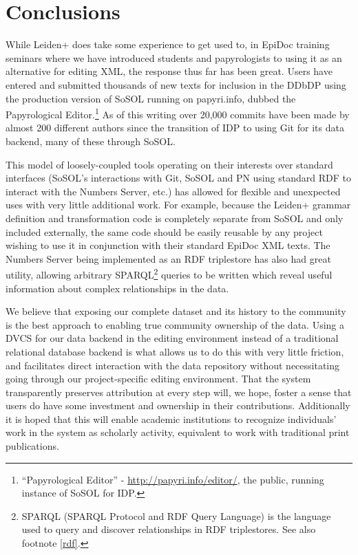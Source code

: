 \documentclass[]{article}
\begin{document}
\section*{Conclusions}

While Leiden+ does take some experience to get used to, in EpiDoc training seminars where we have introduced students and papyrologists to using it as an alternative for editing XML, the response thus far has been great. Users have entered and submitted thousands of new texts for inclusion in the DDbDP using the production version of SoSOL running on papyri.info, dubbed the Papyrological Editor.\footnote{“Papyrological Editor” - \url{http://papyri.info/editor/}, the public, running instance of SoSOL for IDP.} As of this writing over 20,000 commits have been made by almost 200 different authors since the transition of IDP to using Git for its data backend, many of these through SoSOL.

This model of loosely-coupled tools operating on their interests over standard interfaces (SoSOL's interactions with Git, SoSOL and PN using standard RDF to interact with the Numbers Server, etc.) has allowed for flexible and unexpected uses with very little additional work. For example, because the Leiden+ grammar definition and transformation code is completely separate from SoSOL and only included externally, the same code should be easily reusable by any project wishing to use it in conjunction with their standard EpiDoc XML texts. The Numbers Server being implemented as an RDF triplestore has also had great utility, allowing arbitrary SPARQL\footnote{SPARQL (SPARQL Protocol and RDF Query Language) is the language used to query and discover relationships in RDF triplestores. See also footnote \ref{rdf}.} queries to be written which reveal useful information about complex relationships in the data.

We believe that exposing our complete dataset and its history to the community is the best approach to enabling true community ownership of the data. Using a DVCS for our data backend in the editing environment instead of a traditional relational database backend is what allows us to do this with very little friction, and facilitates direct interaction with the data repository without necessitating going through our project-specific editing environment. That the system transparently preserves attribution at every step will, we hope, foster a sense that users do have some investment and ownership in their contributions. Additionally it is hoped that this will enable academic institutions to recognize individuals' work in the system as scholarly activity, equivalent to work with traditional print publications.
\end{document}
